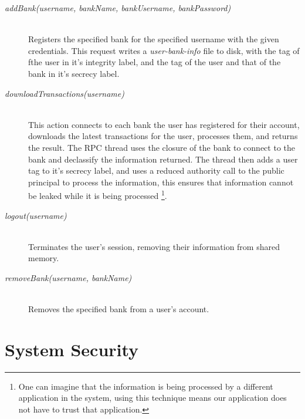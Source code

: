 \begin{description}
  \item[\emph{addBank(username, bankName, bankUsername, bankPassword)}] \ \\
    Registers the specified bank 
    for the specified username with the given 
    credentials.
    This request writes a \emph{user-bank-info} 
    file to disk, with the tag of
    fthe user in it's integrity label, and the 
    tag of the user and that of the bank
    in it's secrecy label.
  \item[\emph{downloadTransactions(username)}] \ \\
    This action connects to each bank the 
    user has registered for their account, 
    downloads the latest transactions for the user, 
    processes them, and returns the result.
    The RPC thread uses the closure of the bank to
    connect to the bank and declassify the 
    information returned. The thread then
    adds a user tag to it's secrecy label, 
    and uses a reduced authority call to 
    the public principal to process the information, 
    this ensures that information
    cannot be leaked while it is being
    processed
    \footnote{One can imagine that the 
    information is being processed by a different
    application in the system, 
    using this technique means our application 
    does not have to trust that 
    application.}. 


  \item[\emph{logout(username)}] \ \\
    Terminates the user's session, removing 
    their information from shared memory.
  \item[\emph{removeBank(username, bankName)}] \ \\
    Removes the specified bank from a user's account.

\end{description}

\section{System Security}

